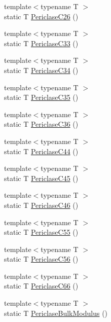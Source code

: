 \begin{DoxyCompactItemize}
{\footnotesize template$<$typename T $>$ }\\static T \mbox{\hyperlink{namespacempc_1_1data_aef5437da43940ba661031b1c5be5d265}{Periclase\+C26}} ()
\item 
{\footnotesize template$<$typename T $>$ }\\static T \mbox{\hyperlink{namespacempc_1_1data_a46951e44597ab9fd5abf95a06e45d396}{Periclase\+C33}} ()
\item 
{\footnotesize template$<$typename T $>$ }\\static T \mbox{\hyperlink{namespacempc_1_1data_ab0d28c36c419acfa865018a341f45e5d}{Periclase\+C34}} ()
\item 
{\footnotesize template$<$typename T $>$ }\\static T \mbox{\hyperlink{namespacempc_1_1data_a253a75bbdb175532a18fc3653eb819be}{Periclase\+C35}} ()
\item 
{\footnotesize template$<$typename T $>$ }\\static T \mbox{\hyperlink{namespacempc_1_1data_a9941f65dac1adf95b216f6c74fc03b30}{Periclase\+C36}} ()
\item 
{\footnotesize template$<$typename T $>$ }\\static T \mbox{\hyperlink{namespacempc_1_1data_a1db1279859f4f4b70a69b3960940c8d5}{Periclase\+C44}} ()
\item 
{\footnotesize template$<$typename T $>$ }\\static T \mbox{\hyperlink{namespacempc_1_1data_ab677a9c32f42231c09e9aff423b5f6ae}{Periclase\+C45}} ()
\item 
{\footnotesize template$<$typename T $>$ }\\static T \mbox{\hyperlink{namespacempc_1_1data_a2751b35f5b9d8950e0d642d189bcb0dc}{Periclase\+C46}} ()
\item 
{\footnotesize template$<$typename T $>$ }\\static T \mbox{\hyperlink{namespacempc_1_1data_a2417becad91c07a960c10cbcbf191281}{Periclase\+C55}} ()
\item 
{\footnotesize template$<$typename T $>$ }\\static T \mbox{\hyperlink{namespacempc_1_1data_a53217114578e10b84a87266893aef8c0}{Periclase\+C56}} ()
\item 
{\footnotesize template$<$typename T $>$ }\\static T \mbox{\hyperlink{namespacempc_1_1data_a9e9baf8088a8c5bc14ffa35a35df4db3}{Periclase\+C66}} ()
\item 
{\footnotesize template$<$typename T $>$ }\\static T \mbox{\hyperlink{namespacempc_1_1data_aa30e6d0800f762cbed907f0b39a117b8}{Periclase\+Bulk\+Modulus}} ()

\end{DoxyCompactItemize}
